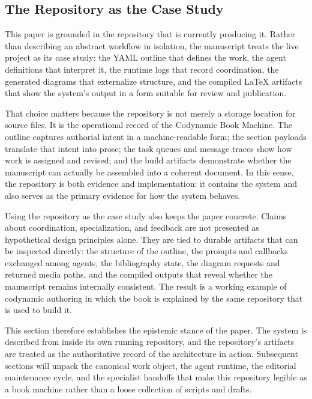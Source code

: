 \documentclass[11pt]{article}
\begin{document}

\subsection{The Repository as the Case Study}


This paper is grounded in the repository that is currently producing it. Rather than describing an abstract workflow in isolation, the manuscript treats the live project as its case study: the YAML outline that defines the work, the agent definitions that interpret it, the runtime logs that record coordination, the generated diagrams that externalize structure, and the compiled \LaTeX{} artifacts that show the system's output in a form suitable for review and publication.

That choice matters because the repository is not merely a storage location for source files. It is the operational record of the Codynamic Book Machine. The outline captures authorial intent in a machine-readable form; the section payloads translate that intent into prose; the task queues and message traces show how work is assigned and revised; and the build artifacts demonstrate whether the manuscript can actually be assembled into a coherent document. In this sense, the repository is both evidence and implementation: it contains the system and also serves as the primary evidence for how the system behaves.

Using the repository as the case study also keeps the paper concrete. Claims about coordination, specialization, and feedback are not presented as hypothetical design principles alone. They are tied to durable artifacts that can be inspected directly: the structure of the outline, the prompts and callbacks exchanged among agents, the bibliography state, the diagram requests and returned media paths, and the compiled outputs that reveal whether the manuscript remains internally consistent. The result is a working example of codynamic authoring in which the book is explained by the same repository that is used to build it.

This section therefore establishes the epistemic stance of the paper. The system is described from inside its own running repository, and the repository's artifacts are treated as the authoritative record of the architecture in action. Subsequent sections will unpack the canonical work object, the agent runtime, the editorial maintenance cycle, and the specialist handoffs that make this repository legible as a book machine rather than a loose collection of scripts and drafts.
\end{document}
